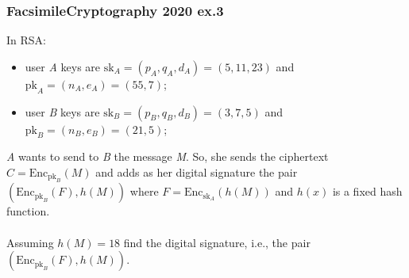 \newpage
\subsubsection{FacsimileCryptography 2020 ex.3}
In RSA:
\begin{itemize}
    \item user \textit{A} keys are $\text{sk}_A = (p_A,q_A,d_A) = (5,11,23)$ and $\text{pk}_A = (n_A, e_A) = (55, 7)$;
    \item user \textit{B} keys are $\text{sk}_B = (p_B,q_B,d_B) = (3,7,5)$ and $\text{pk}_B = (n_B, e_B) = (21,5)$;
\end{itemize}
\textit{A} wants to send to \textit{B} the message \textit{M}. So, she sends the ciphertext $C = \text{Enc}_{\text{pk}_B}(M)$ and adds as her digital signature the pair $(\text{Enc}_{\text{pk}_B}(F),h(M))$ where $F = \text{Enc}_{\text{sk}_A}(h(M))$ and $h(x)$ is a fixed hash function.\\\\
Assuming $h(M)=18$ find the digital signature, i.e., the pair $(\text{Enc}_{\text{pk}_B}(F),h(M))$.

